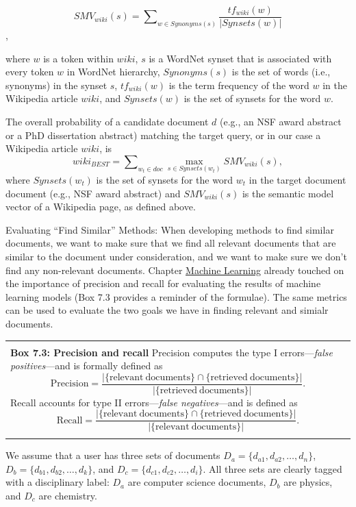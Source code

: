\documentclass[]{krantz}
\newenvironment{F00}
    {\begin{center}
    \begin{tabular}{|p{0.9\textwidth}|}
    \hline\\
    }
    { 
    \\\\\hline
    \end{tabular} 
    \end{center}
    }
\begin{document}
\[SMV_{wiki}(s) = \sum\nolimits_{w\in Synonyms(s)} \frac{tf_{wiki}(w)}{|Synsets(w)|}\],

where \(w\) is a token within \(wiki\), \(s\) is a WordNet synset that
is associated with every token \(w\) in WordNet hierarchy,
\(Synonyms(s)\) is the set of words (i.e., synonyms) in the synset
\(s\), \(tf_{wiki}(w)\) is the term frequency of the word \(w\) in the
Wikipedia article \(wiki\), and \(Synsets(w)\) is the set of synsets for
the word \(w\).

The overall probability of a candidate document \(d\) (e.g., an NSF
award abstract or a PhD dissertation abstract) matching the target
query, or in our case a Wikipedia article \(wiki\), is
\[wiki_{BEST}=\sum\nolimits_{w_t\in doc} \max_{s\in Synsets(w_t)} SMV_{wiki}(s),\]
where \(Synsets(w_t)\) is the set of synsets for the word \(w_t\) in the
target document document (e.g., NSF award abstract) and
\(SMV_{wiki}(s)\) is the semantic model vector of a Wikipedia page, as
defined above.

Evaluating ``Find Similar'' Methods: When developing methods to find
similar documents, we want to make sure that we find all relevant
documents that are similar to the document under consideration, and we
want to make sure we don't find any non-relevant documents. Chapter
\protect\hyperlink{chap:ml}{Machine Learning} already touched on the
importance of precision and recall for evaluating the results of machine
learning models (Box 7.3 provides a reminder of the formulae). The same
metrics can be used to evaluate the two goals we have in finding
relevant and simialr documents.

\begin{F00}
\textbf{Box 7.3: Precision and recall} Precision computes the type I
errors---\emph{false positives}---and is formally defined as
\[\mathrm{Precision} = \frac{|\{\mathrm{relevant\ documents}\}\cap \{\mathrm{retrieved\ documents}\}|}{|\{\mathrm{retrieved\ documents}\}|}.\]
Recall accounts for type II errors---\emph{false negatives}---and is
defined as
\[\mathrm{Recall}=\frac{|\{\mathrm{relevant\ documents}\}\cap \{\mathrm{retrieved\ documents}\}|}{|\{\mathrm{relevant\ documents}\}|}.\]
\end{F00}

We assume that a user has three sets of documents
\(D_a =\{d_{a1},d_{a2},\ldots, d_n\}\),
\(D_b=\{d_{b1}, d_{b2}, \ldots, d_k\}\), and
\(D_c =\{d_{c1},d_{c2},\ldots,d_i\}\). All three sets are clearly tagged
with a disciplinary label: \(D_a\) are computer science documents,
\(D_b\) are physics, and \(D_c\) are chemistry.
\end{document}
